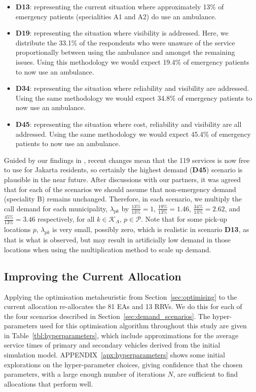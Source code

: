 \documentclass[numbers,webpdf,imaman]{ima-authoring-template}%
\begin{document}
\begin{itemize}
  \item \textbf{D13}: representing the current situation where approximately
        13\% of emergency patients (specialities A1 and A2) do use an ambulance.
  \item \textbf{D19}: representing the situation where visibility is addressed.
        Here, we distribute the 33.1\% of the respondents who were unaware of
        the service proportionally between using the ambulance and amongst the
        remaining issues. Using this methodology we would expect 19.4\% of
        emergency patients to now use an ambulance.  
  \item \textbf{D34}: representing the situation where reliability and
        visibility are addressed. Using the same methodology we would expect
        34.8\% of emergency patients to now use an ambulance.
  \item \textbf{D45}: representing the situation where cost, reliability and
        visibility are all addressed. Using the same methodology we would expect
        45.4\% of emergency patients to now use an ambulance. 
\end{itemize}

Guided by our findings in \citet{BriceSyaribahNoor2022Esui}, recent changes
mean that the 119 services is now free to use for Jakarta residents, so
certainly the highest demand (\textbf{D45}) scenario is plausible in the near
future. After discussions with our partners, it was agreed that for each of
the scenarios we should assume that non-emergency demand (speciality B)
remains unchanged.
Therefore, in each scenario, we multiply the call demand for
each municipality, $\lambda_{pk}$ by $\frac{13\%}{13\%}=1$,
$\frac{19\%}{13\%}=1.46$, $\frac{34\%}{13\%}=2.62$, and
$\frac{45\%}{13\%}=3.46$ respectively, for all $k \in \mathcal{K}_A$,
$p \in \mathcal{P}$. Note that for some pick-up locations $p$, $\lambda_{pk}$
is very small, possibly zero, which is realistic in scenario \textbf{D13}, as
that is what is observed, but may result in artificially low demand in those
locations when using the multiplication method to scale up demand.

\subsection{Improving the Current Allocation}\label{sec:optimise_current}
Applying the optimisation metaheuristic from Section~\ref{sec:optimising} to the
current allocation re-allocates the 81 EAs and 13 RRVs. We do this for each of
the four scenarios described in Section~\ref{sec:demand_scenarios}. The
hyper-parameters used for this optimisation algorithm throughout this study are
given in Table~\ref{tbl:hyperparameters}, which include approximations for the
average service times of primary and secondary vehicles derived from the initial
simulation model. APPENDIX~\ref{apx:hyperparameters} shows some initial explorations on
the hyper-parameter choices, giving confidence that the chosen parameters, with
a large enough number of iterations $N$, are sufficient to find allocations
that perform well.
\end{document}
